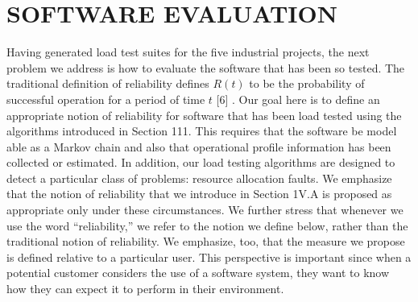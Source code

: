 \documentclass[journal, twoside]{IEEEtran}
\begin{document}
\section{SOFTWARE EVALUATION}
Having generated load test suites for the five industrial
projects, the next problem we address is how to evaluate the
software that has been so tested. The traditional definition of
reliability defines $R(t)$ to be the probability of successful operation for a period of time $t$ [6] . Our goal here is to define an appropriate notion of reliability for software that has been load
tested using the algorithms introduced in Section 111. This requires that the software be model able as a Markov chain and
also that operational profile information has been collected or
estimated. In addition, our load testing algorithms are designed
to detect a particular class of problems: resource allocation
faults. We emphasize that the notion of reliability that we introduce in Section 1V.A is proposed as appropriate only under
these circumstances. We further stress that whenever we use
the word “reliability,” we refer to the notion we define below,
rather than the traditional notion of reliability. We emphasize,
too, that the measure we propose is defined relative to a particular user. This perspective is important since when a potential customer considers the use of a software system, they want
to know how they can expect it to perform in their
environment. 
\vspace{2cm}
\end{document}
